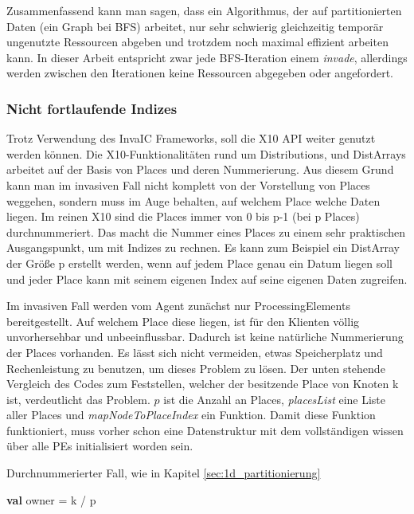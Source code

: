 Zusammenfassend kann man sagen, dass ein Algorithmus, der auf partitionierten Daten (ein Graph bei BFS) arbeitet, nur sehr schwierig gleichzeitig temporär ungenutzte Ressourcen abgeben und trotzdem noch maximal effizient arbeiten kann. In dieser Arbeit entspricht zwar jede BFS-Iteration einem \textit{invade}, allerdings werden zwischen den Iterationen keine Ressourcen abgegeben oder angefordert.

\subsubsection{Nicht fortlaufende Indizes} %
\label{ssub:nicht_fortlaufende_indizes}
Trotz Verwendung des InvaIC Frameworks, soll die X10 API weiter genutzt werden können. Die X10-Funktionalitäten rund um Distributions, und DistArrays arbeitet auf der Basis von Places und deren Nummerierung. Aus diesem Grund kann man im invasiven Fall nicht komplett von der Vorstellung von Places weggehen, sondern muss im Auge behalten, auf welchem Place welche Daten liegen. Im reinen X10 sind die Places immer von 0 bis p-1 (bei p Places) durchnummeriert. Das macht die Nummer eines Places zu einem sehr praktischen Ausgangspunkt, um mit Indizes zu rechnen. Es kann zum Beispiel ein DistArray der Größe p erstellt werden, wenn auf jedem Place genau ein Datum liegen soll und jeder Place kann mit seinem eigenen Index auf seine eigenen Daten zugreifen.

Im invasiven Fall werden vom Agent zunächst nur ProcessingElements bereitgestellt. Auf welchem Place diese liegen, ist für den Klienten völlig unvorhersehbar und unbeeinflussbar. Dadurch ist keine natürliche Nummerierung der Places vorhanden. Es lässt sich nicht vermeiden, etwas Speicherplatz und Rechenleistung zu benutzen, um dieses Problem zu lösen. Der unten stehende Vergleich des Codes zum Feststellen, welcher der besitzende Place von Knoten k ist, verdeutlicht das Problem. $p$ ist die Anzahl an Places, \textit{placesList} eine Liste aller Places und \textit{mapNodeToPlaceIndex} ein Funktion. Damit diese Funktion funktioniert, muss vorher schon eine Datenstruktur mit dem vollständigen wissen über alle PEs initialisiert worden sein.
\begin{algorithm}
	\caption{Durchnummerierter Fall, wie in Kapitel \ref{sec:1d_partitionierung}}
	\label{alg:owner_consecutive}
	\begin{algorithmic}[1]
		\State \textbf{val} owner = k / p
	\end{algorithmic}
\end{algorithm}

